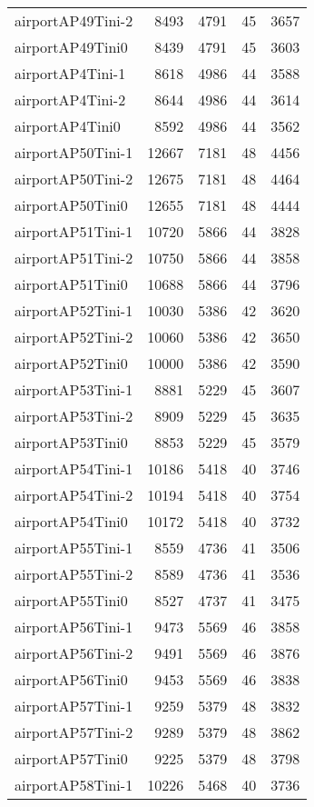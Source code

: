 \begin{longtable}{lrrrr}
airportAP49Tini-2 & 8493 & 4791 & 45 & 3657 \\
airportAP49Tini0 & 8439 & 4791 & 45 & 3603 \\
airportAP4Tini-1 & 8618 & 4986 & 44 & 3588 \\
airportAP4Tini-2 & 8644 & 4986 & 44 & 3614 \\
airportAP4Tini0 & 8592 & 4986 & 44 & 3562 \\
airportAP50Tini-1 & 12667 & 7181 & 48 & 4456 \\
airportAP50Tini-2 & 12675 & 7181 & 48 & 4464 \\
airportAP50Tini0 & 12655 & 7181 & 48 & 4444 \\
airportAP51Tini-1 & 10720 & 5866 & 44 & 3828 \\
airportAP51Tini-2 & 10750 & 5866 & 44 & 3858 \\
airportAP51Tini0 & 10688 & 5866 & 44 & 3796 \\
airportAP52Tini-1 & 10030 & 5386 & 42 & 3620 \\
airportAP52Tini-2 & 10060 & 5386 & 42 & 3650 \\
airportAP52Tini0 & 10000 & 5386 & 42 & 3590 \\
airportAP53Tini-1 & 8881 & 5229 & 45 & 3607 \\
airportAP53Tini-2 & 8909 & 5229 & 45 & 3635 \\
airportAP53Tini0 & 8853 & 5229 & 45 & 3579 \\
airportAP54Tini-1 & 10186 & 5418 & 40 & 3746 \\
airportAP54Tini-2 & 10194 & 5418 & 40 & 3754 \\
airportAP54Tini0 & 10172 & 5418 & 40 & 3732 \\
airportAP55Tini-1 & 8559 & 4736 & 41 & 3506 \\
airportAP55Tini-2 & 8589 & 4736 & 41 & 3536 \\
airportAP55Tini0 & 8527 & 4737 & 41 & 3475 \\
airportAP56Tini-1 & 9473 & 5569 & 46 & 3858 \\
airportAP56Tini-2 & 9491 & 5569 & 46 & 3876 \\
airportAP56Tini0 & 9453 & 5569 & 46 & 3838 \\
airportAP57Tini-1 & 9259 & 5379 & 48 & 3832 \\
airportAP57Tini-2 & 9289 & 5379 & 48 & 3862 \\
airportAP57Tini0 & 9225 & 5379 & 48 & 3798 \\
airportAP58Tini-1 & 10226 & 5468 & 40 & 3736 \\

\end{longtable}
